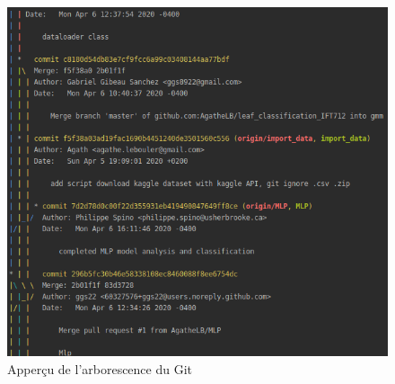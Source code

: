     \begin{figure}[H]
        \centering
        \includegraphics[width=12cm]{images/git_graph.png}
        \caption{Apperçu de l'arborescence du Git}
        \label{fig:git_graph}
    \end{figure}
